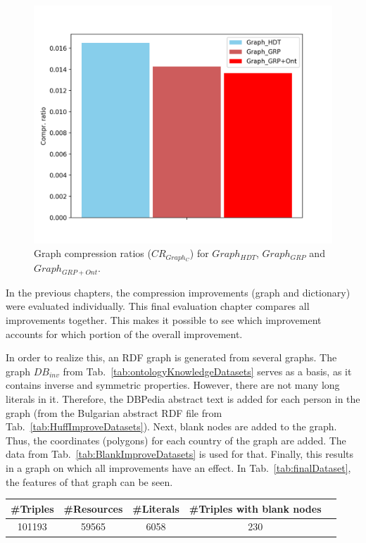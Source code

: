 \begin{figure}
	\centering
	\includegraphics[width=0.6\linewidth]{figures/4_evaluation/final/graphcompr}
	\caption{Graph compression ratios ($CR_{Graph_C}$) for $Graph_{HDT}$, $Graph_{GRP}$ and $Graph_{GRP+Ont}$.}
	\label{fig:graphcompr}
\end{figure}


In the previous chapters, the compression improvements (graph and dictionary) were evaluated individually. This final evaluation chapter compares all improvements together. This makes it possible to see which improvement accounts for which portion of the overall improvement. 

In order to realize this, an RDF graph is generated from several graphs. The graph $DB_{inv}$ from Tab.~\ref{tab:ontologyKnowledgeDatasets} serves as a basis, as it contains inverse and symmetric properties. However, there are not many long literals in it. Therefore, the DBPedia abstract text is added for each person in the graph (from the Bulgarian abstract RDF file from Tab.~\ref{tab:HuffImproveDatasets}). Next, blank nodes are added to the graph. Thus, the coordinates (polygons) for each country of the graph are added. The data from Tab.~\ref{tab:BlankImproveDatasets} is used for that. Finally, this results in a graph on which all improvements have an effect. In Tab.~\ref{tab:finalDataset}, the features of that graph can be seen.

\begin{center}
	\begin{tabular}{|c|c|c|c|c|}
		\hline 
		 \#Triples & \#Resources & \#Literals & \#Triples with blank nodes \\ 
		\hline
		101193 &59565 & 6058 & 230 \\
		\hline 
	\end{tabular} 
	\label{tab:finalDataset}
\end{center}

